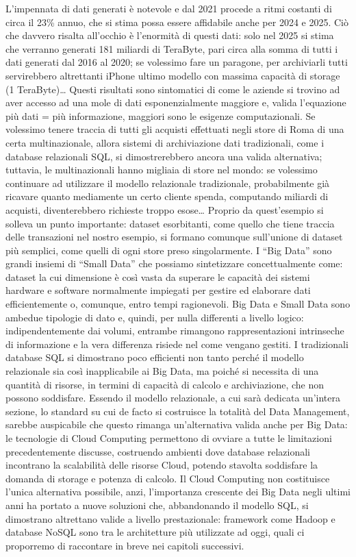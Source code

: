 \documentclass[a4paper,12pt]{report}
\begin{document}
L’impennata di dati generati è notevole e dal 2021 procede a ritmi costanti di circa il 23\% annuo, che si stima possa essere affidabile anche per 2024 e 2025. Ciò che davvero risalta all’occhio è l’enormità di questi dati: solo nel 2025 si stima che verranno generati 181 miliardi di TeraByte, pari circa alla somma di tutti i dati generati dal 2016 al 2020; se volessimo fare un paragone, per archiviarli tutti servirebbero altrettanti iPhone ultimo modello con massima capacità di storage (1 TeraByte)… Questi risultati sono sintomatici di come le aziende si trovino ad aver accesso ad una mole di dati esponenzialmente maggiore e, valida l’equazione più dati = più informazione, maggiori sono le esigenze computazionali. Se volessimo tenere traccia di tutti gli acquisti effettuati negli store di Roma di una certa multinazionale, allora sistemi di archiviazione dati tradizionali, come i database relazionali SQL, si dimostrerebbero ancora una valida alternativa; tuttavia, le multinazionali hanno migliaia di store nel mondo: se volessimo continuare ad utilizzare il modello relazionale tradizionale, probabilmente già ricavare quanto mediamente un certo cliente spenda, computando miliardi di acquisti, diventerebbero richieste troppo esose… Proprio da quest’esempio si solleva un punto importante: dataset esorbitanti, come quello che tiene traccia delle transazioni nel nostro esempio, si formano comunque sull’unione di dataset più semplici, come quelli di ogni store preso singolarmente. I “Big Data” sono grandi insiemi di “Small Data” che possiamo sintetizzare concettualmente come: dataset la cui dimensione è così vasta da superare le capacità dei sistemi hardware e software normalmente impiegati per gestire ed elaborare dati efficientemente o, comunque, entro tempi ragionevoli. Big Data e Small Data sono ambedue tipologie di dato e, quindi, per nulla differenti a livello logico: indipendentemente dai volumi, entrambe rimangono rappresentazioni intrinseche di informazione e la vera differenza risiede nel come vengano gestiti. I tradizionali database SQL si dimostrano poco efficienti non tanto perché il modello relazionale sia così inapplicabile ai Big Data, ma poiché si necessita di una quantità di risorse, in termini di capacità di calcolo e archiviazione, che non possono soddisfare. Essendo il modello relazionale, a cui sarà dedicata un’intera sezione, lo standard su cui de facto si costruisce la totalità del Data Management, sarebbe auspicabile che questo rimanga un’alternativa valida anche per Big Data: le tecnologie di Cloud Computing permettono di ovviare a tutte le limitazioni precedentemente discusse, costruendo ambienti dove database relazionali incontrano la scalabilità delle risorse Cloud, potendo stavolta soddisfare la domanda di storage e potenza di calcolo. Il Cloud Computing non costituisce l’unica alternativa possibile, anzi, l’importanza crescente dei Big Data negli ultimi anni ha portato a nuove soluzioni che, abbandonando il modello SQL, si dimostrano altrettano valide a livello prestazionale: framework come Hadoop e database NoSQL sono tra le architetture più utilizzate ad oggi, quali ci proporremo di raccontare in breve nei capitoli successivi.
\end{document}
